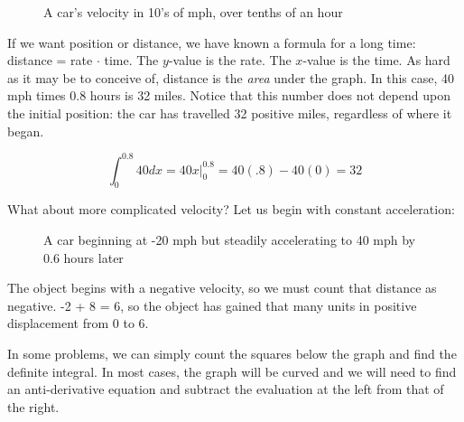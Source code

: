 \begin{figure}[h]
\begin{centering}
\caption{A car's velocity in 10's of mph, over tenths of an hour}
\end{centering}
\end{figure}


If we want position or distance, we have known a formula for a long time:
distance = rate $\cdot$ time.  The $y$-value is the rate.  The $x$-value is the 
time.  As hard as it may be to conceive of, distance is the \emph{area} under the
graph.  In this case, 40 mph times 0.8 hours is 32 miles.   Notice that this number does
not depend upon the initial position: the car has travelled 32 positive miles, regardless 
of where it began.

\begin{equation}
\int_0^0.8  40dx = \left.40x \right|_0^0.8 = 40(.8) - 40(0) = 32
\end{equation}

What about more complicated velocity?  Let us begin with constant acceleration:

\begin{figure}[h]
\begin{centering}
\caption{A car beginning at -20 mph but steadily accelerating to 40 mph by 0.6 hours later}
\end{centering}
\end{figure}

The object begins with a negative velocity, so we must count that distance as negative.
-2 + 8 = 6, so the object has gained that many units in positive displacement from 0 to 6.

In some problems, we can simply count the squares below the graph and find the
definite integral.  In most cases, the graph will be curved and we will need to find an
anti-derivative equation and subtract the evaluation at the left from that of the right.

